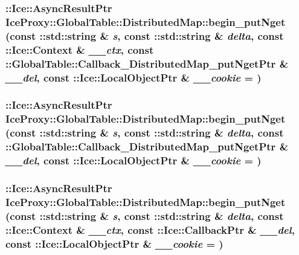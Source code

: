 \label{class_ice_proxy_1_1_global_table_1_1_distributed_map_a3373fde3c2f8126148f819ff7dc10af6}
\hypertarget{class_ice_proxy_1_1_global_table_1_1_distributed_map_a22f56ad87f754bf496a6b636f604fdba}{
\subsubsection[{begin\_\-putNget}]{\setlength{\rightskip}{0pt plus 5cm}::Ice::AsyncResultPtr IceProxy::GlobalTable::DistributedMap::begin\_\-putNget (const ::std::string \& {\em s}, \/  const ::std::string \& {\em delta}, \/  const ::Ice::Context \& {\em \_\-\_\-ctx}, \/  const ::{\bf GlobalTable::Callback\_\-DistributedMap\_\-putNgetPtr} \& {\em \_\-\_\-del}, \/  const ::Ice::LocalObjectPtr \& {\em \_\-\_\-cookie} = {})}}
\label{class_ice_proxy_1_1_global_table_1_1_distributed_map_a22f56ad87f754bf496a6b636f604fdba}
\hypertarget{class_ice_proxy_1_1_global_table_1_1_distributed_map_a303a4c51b86fce029f63e4e33a96df08}{
\subsubsection[{begin\_\-putNget}]{\setlength{\rightskip}{0pt plus 5cm}::Ice::AsyncResultPtr IceProxy::GlobalTable::DistributedMap::begin\_\-putNget (const ::std::string \& {\em s}, \/  const ::std::string \& {\em delta}, \/  const ::{\bf GlobalTable::Callback\_\-DistributedMap\_\-putNgetPtr} \& {\em \_\-\_\-del}, \/  const ::Ice::LocalObjectPtr \& {\em \_\-\_\-cookie} = {})}}
\label{class_ice_proxy_1_1_global_table_1_1_distributed_map_a303a4c51b86fce029f63e4e33a96df08}
\hypertarget{class_ice_proxy_1_1_global_table_1_1_distributed_map_ac3143fd6a6c05e877f1e47ce77e2a327}{
\subsubsection[{begin\_\-putNget}]{\setlength{\rightskip}{0pt plus 5cm}::Ice::AsyncResultPtr IceProxy::GlobalTable::DistributedMap::begin\_\-putNget (const ::std::string \& {\em s}, \/  const ::std::string \& {\em delta}, \/  const ::Ice::Context \& {\em \_\-\_\-ctx}, \/  const ::Ice::CallbackPtr \& {\em \_\-\_\-del}, \/  const ::Ice::LocalObjectPtr \& {\em \_\-\_\-cookie} = {})}}
